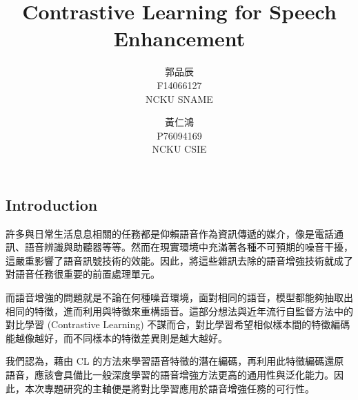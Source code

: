 \documentclass[10pt,twocolumn,letterpaper]{article}
\begin{document}
\begin{CJK}{UTF8}{bkai}
   \title{Contrastive Learning for Speech Enhancement}

   \author{郭品辰\\
      F14066127\\
      NCKU SNAME
      \and
      黃仁鴻\\
      P76094169\\
      NCKU CSIE}

   \maketitle

   \section{Introduction}

   許多與日常生活息息相關的任務都是仰賴語音作為資訊傳遞的媒介，像是電話通訊、語音辨識與助聽器等等。然而在現實環境中充滿著各種不可預期的噪音干擾，這嚴重影響了語音訊號技術的效能。因此，將這些雜訊去除的語音增強技術就成了對語音任務很重要的前置處理單元。

   而語音增強的問題就是不論在何種噪音環境，面對相同的語音，模型都能夠抽取出相同的特徵，進而利用與特徵來重構語音。這部分想法與近年流行自監督方法中的對比學習
   (Contrastive Learning) 不謀而合，對比學習希望相似樣本間的特徵編碼能越像越好，而不同樣本的特徵差異則是越大越好。

   我們認為，藉由 CL 的方法來學習語音特徵的潛在編碼，再利用此特徵編碼還原語音，應該會具備比一般深度學習的語音增強方法更高的通用性與泛化能力。因此，本次專題研究的主軸便是將對比學習應用於語音增強任務的可行性。

\end{CJK}
\end{document}
